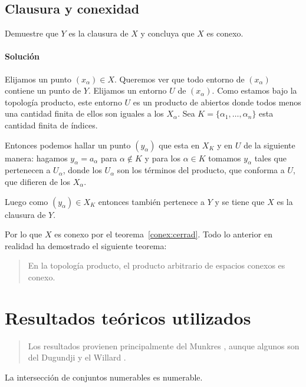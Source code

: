 \documentclass[letterpaper,10pt,final]{article}
\begin{document}
\subsection{Clausura y conexidad}

Demuestre que $Y$ es la clausura de $X$ y concluya que $X$ es conexo.

\paragraph{Solución}
Elijamos un punto $(x_\alpha)\in X$. Queremos ver que todo entorno de $(x_\alpha)$ contiene
un punto de $Y$. Elijamos un entorno $U$ de $(x_\alpha)$. Como estamos bajo
la topología producto, este entorno $U$ es un producto de abiertos donde todos
menos una cantidad finita de ellos son iguales a los $X_\alpha$. Sea
$K=\{\alpha_1,\dots,\alpha_n\}$ esta cantidad finita de índices.

Entonces podemos hallar un punto $(y_\alpha)$ que esta en $X_K$ y  en $U$ de la siguiente manera:
hagamos $y_\alpha=a_\alpha$ para $\alpha\notin K$ y para los $\alpha\in K$ tomamos $y_\alpha$
tales que pertenecen a $U_\alpha$, donde los $U_\alpha$ son los términos
del producto, que conforma a $U$, que difieren de los $X_\alpha$.

Luego como $(y_\alpha)\in X_K$ entonces también pertenece a $Y$ y se tiene
que $X$ es la clausura de $Y$.

Por lo que $X$ es conexo por el teorema~\ref{conex:cerrad}. Todo lo anterior en realidad ha demostrado
el siguiente teorema:
\begin{quote}
	En la topología producto, el producto arbitrario de espacios conexos es conexo.	
\end{quote}

\section{Resultados teóricos utilizados}

\begin{quote}
	\small Los resultados provienen principalmente del Munkres \cite{munkres_topology_2014},
	aunque algunos son del Dugundji \cite{dugundji_topology_1987} y el Willard \cite{willard_general_1970}.
\end{quote}

\begin{teo}\label{teo:interConNum}
	La intersección de conjuntos numerables es numerable.
\end{teo}
\end{document}

